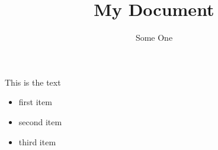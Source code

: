 \documentclass[12pt,twoside,letterpaper]{memoir}
\title{My Document}
\author{Some One}
\date{}
\begin{document}
\maketitle

This is the text

\begin{itemize}
  \item first item
  \item second item
  \item third item
\end{itemize}
\end{document}
